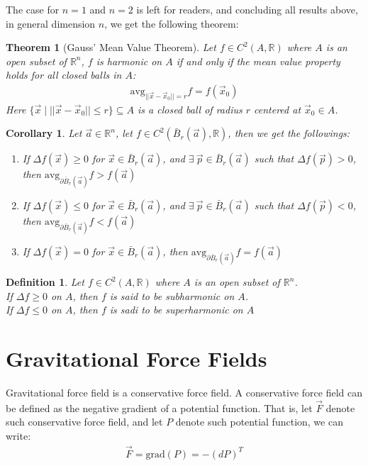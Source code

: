 \documentclass[11pt,oneside]{book}
\theoremstyle{break}
\theoremstyle{break}
\newtheorem{thm}{Theorem}[section]
\newtheorem{corT}[lem]{Corollary}
\newtheorem{defn}{Definition}[corL]
\newcommand{\R}{\mathbb{R}}
\begin{document}
The case for $n=1$ and $n=2$ is left for readers, and concluding all results above, in general dimension $n$, we get the following theorem:

\begin{thm}[Gauss' Mean Value Theorem]
Let $f \in C^2(A,\R)$ where $A$ is an open subset of $\R^n$, $f$ is harmonic on $A$ if and only if the  mean value property holds for all closed balls in $A$:
\begin{align*}
\text{avg}_{||\vec{x} - \vec{x}_0||=r}f = f(\vec{x}_0)
\end{align*}
Here $\{\vec{x}\mid ||\vec{x} - \vec{x}_0||\leq r\} \subseteq A$ is a closed ball of radius $r$ centered at $\vec{x}_0 \in A$.
\end{thm}

\newpage
\begin{corT}
Let $\vec{a}\in \R^n$, let $f \in C^2(\bar{B}_r(\vec{a}), \R)$, then we get the followings:
\begin{enumerate}[topsep=3pt,itemsep=-1ex,partopsep=1ex,parsep=1ex]
\item If $\Delta f(\vec{x}) \geq 0$ for $\vec{x}\in \bar{B}_r(\vec{a})$, and $\exists\ \vec{p}\in \bar{B}_r(\vec{a})$ such that $\Delta f(\vec{p}) >0$, then $\text{avg}_{\partial \bar{B}_r(\vec{a})} f > f(\vec{a})$
\item If $\Delta f(\vec{x}) \leq 0$ for $\vec{x}\in \bar{B}_r(\vec{a})$, and $\exists\ \vec{p}\in \bar{B}_r(\vec{a})$ such that $\Delta f(\vec{p}) <0$, then $\text{avg}_{\partial \bar{B}_r(\vec{a})} f < f(\vec{a})$
\item If $\Delta f(\vec{x}) = 0$ for $\vec{x}\in \bar{B}_r(\vec{a})$, then $\text{avg}_{\partial \bar{B}_r(\vec{a})} f = f(\vec{a})$
\end{enumerate}
\end{corT}
\begin{defn}
Let $f \in C^2(A,\R)$ where $A$ is an open subset of $\R^n$.\\
If $\Delta f \geq 0$ on $A$, then $f$ is said to be subharmonic on $A$. \\
If $\Delta f \leq 0$ on $A$, then $f$ is sadi to be superharmonic on $A$
\end{defn}


\newpage
\section[Gravitational Force Field]{\color{red}Gravitational Force Fields\color{black}}
Gravitational force field is a conservative force field. A conservative force field can be defined as the negative gradient of a potential function. That is, let $\vec{F}$ denote such conservative force field, and let $P$ denote such potential function, we can write:
\begin{align*}
\vec{F} = \text{grad}(P) = -(dP)^T
\end{align*}
\end{document}
